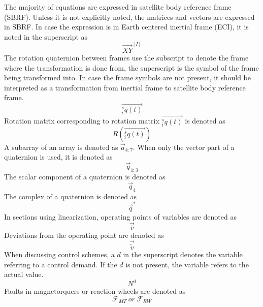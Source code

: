 The majority of equations are expressed in satellite body reference frame (SBRF). Unless it is not explicitly noted, the matrices and vectors are expressed in SBRF. In case the expression is in Earth centered inertial frame (ECI), it is noted in the superscript as 
\begin{equation*}
\vec{XY}^{[I]}
\end{equation*}
The rotation quaternion between frames use the subscript to denote the frame where the transformation is done from, the superscript is the symbol of the frame being transformed into. In case the frame symbols are not present, it should be interpreted as a transformation from inertial frame to satellite body reference frame.
\begin{equation*}
\vec{^s_i q(t)}
\end{equation*}
Rotation matrix corresponding to rotation matrix $\vec{^s_i q(t)}$ is denoted as
\begin{equation*}
\underline{R}(\vec{^s_i q(t)})
\end{equation*}
A subarray of an array is denoted as $\vec{a}_{4:7}$. When only the vector part of a quaternion is used, it is denoted as 
\begin{equation*}
\vec{q}_{1:3}
\end{equation*}
The scalar component of a quaternion is denoted as 
\begin{equation*}
\vec{q}_{4}
\end{equation*}
The complex of a quaternion is denoted as
\begin{equation*}
\vec q^\ast
\end{equation*}
In sections using linearization, operating points of variables are denoted as
\begin{equation*}
\vec{\bar{v}}
\end{equation*}
Deviations from the operating point are denoted as
\begin{equation*}
\vec{\tilde{v}}
\end{equation*}
When discussing control schemes, a $d$ in the superscript denotes the variable referring to a control demand. If the $d$ is not present, the variable refers to the actual value.
\begin{equation*}
N^d
\end{equation*}
Faults in magnetorquers or reaction wheels are denoted as
\begin{equation*}
\mathcal{F}_{MT} \ or  \  \mathcal{F}_{RW}
\end{equation*}

